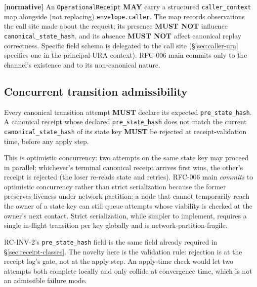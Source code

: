 \documentclass[11pt,a4paper]{article}
\newcommand{\normsv}{\textcolor{normativecolor}{\textbf{[normative]}}\xspace}
\theoremstyle{definition}
\begin{document}
\normsv{}
An \texttt{OperationalReceipt} \textbf{MAY} carry a structured
\texttt{caller\_context} map alongside (not replacing)
\texttt{envelope.caller}. The map records observations the call
site made about the request; its presence \textbf{MUST NOT}
influence \texttt{canonical\_state\_hash}, and its absence
\textbf{MUST NOT} affect canonical replay correctness. Specific
field schema is delegated to the call site (\S\ref{sec:caller-ura}
specifies one in the principal-URA context). RFC-006 main commits
only to the channel's existence and to its non-canonical nature.

\subsection{Concurrent transition admissibility}
\label{sec:concurrency}

\begin{invariant}[RC-INV-2]
Every canonical transition attempt \textbf{MUST} declare its
expected \texttt{pre\_state\_hash}. A canonical receipt whose
declared \texttt{pre\_state\_hash} does not match the current
\texttt{canonical\_state\_hash} of its state key \textbf{MUST}
be rejected at receipt-validation time, before any apply step.
\end{invariant}

This is optimistic concurrency: two attempts on the same state key
may proceed in parallel; whichever's terminal canonical receipt
arrives first wins, the other's receipt is rejected (the loser
re-reads state and retries). RFC-006 main \emph{commits} to
optimistic concurrency rather than strict serialization because the
former preserves liveness under network partition: a node that
cannot temporarily reach the owner of a state key can still queue
attempts whose viability is checked at the owner's next contact.
Strict serialization, while simpler to implement, requires a
single in-flight transition per key globally and is
network-partition-fragile.

\begin{notebox}
RC-INV-2's \texttt{pre\_state\_hash} field is the same field
already required in \S\ref{sec:receipt-classes}. The novelty here
is the validation rule: rejection is at the receipt log's gate,
not at the apply step. An apply-time check would let two attempts
both complete locally and only collide at convergence time, which
is not an admissible failure mode.
\end{notebox}

\end{document}
